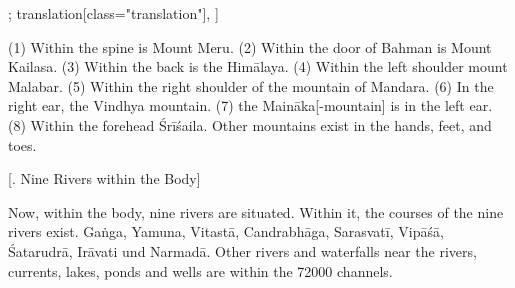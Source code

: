 \begin{alignment}[
  texts=edition[class="edition"];
  translation[class="translation"],
  ]
\begin{translation}
\begin{tlate}
(1) Within the spine is Mount Meru. (2) Within the door of Bahman is Mount Kailasa. (3) Within the back is the Himālaya. (4) Within the left shoulder mount Malabar. (5) Within the right shoulder of the mountain of Mandara. (6) In the right ear, the Vindhya mountain. (7) the Maināka[-mountain] is in the left ear. (8) Within the forehead Śrīśaila. Other mountains exist in the hands, feet, and toes.
\end{tlate}
\begin{tlate}
  \bigskip
\centerline{\textrm{\small{[. Nine Rivers within the Body]}}}
  \bigskip
  Now, within the body, nine rivers are situated. Within it, the courses of the nine rivers exist. Gaṅga, Yamuna, Vitastā, Candrabhāga, Sarasvatī, Vipāśā, Śatarudrā, Irāvati und Narmadā. Other rivers and waterfalls near the rivers, currents, lakes, ponds and wells are within the 72000 channels.
\end{tlate}
  \end{translation}
\end{alignment}
\pagebreak %
